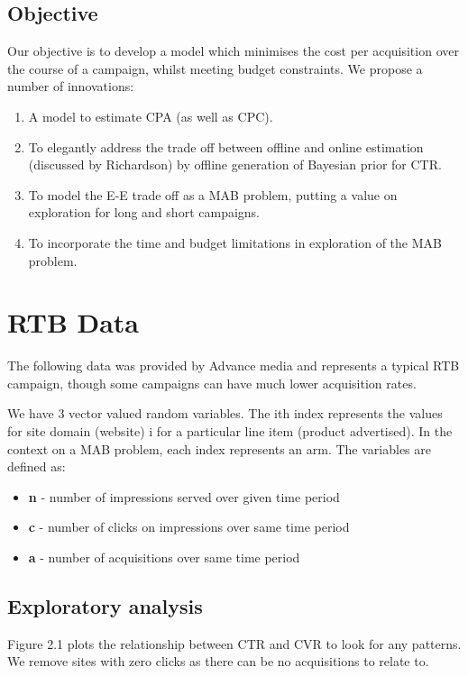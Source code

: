 \documentclass[11pt,a4,singlespacing,titlepagenumber=on]{scrreprt}
\numberwithin{equation}{chapter} %
\theoremstyle{remark}
\begin{document}
\section{Objective}
Our objective is to develop a model which minimises the cost per acquisition over the course of a campaign, whilst meeting budget constraints. We propose a number of innovations:
\begin{enumerate}
	\item A model to estimate CPA (as well as CPC).
	\item To elegantly address the trade off between offline and online estimation (discussed by Richardson) by offline generation of Bayesian prior for CTR.
	\item To model the E-E trade off as a MAB problem, putting a value on exploration for long and short campaigns.
	\item To incorporate the time and budget limitations in exploration of the MAB problem.
\end{enumerate}


\chapter{RTB Data}

The following data was provided by Advance media and represents a typical RTB campaign, though some campaigns can have much lower acquisition rates.

We have 3 vector valued random variables. The ith index represents the values for site domain (website) i for a particular line item (product advertised). In the context on a MAB problem, each index represents an arm. The variables are defined as:
\begin{itemize}
	\item \textbf{n} - number of impressions served over given time period
	\item \textbf{c} - number of clicks on impressions over same time period 
	\item \textbf{a} - number of acquisitions over same time period
\end{itemize}

\section{Exploratory analysis}

Figure 2.1 plots the relationship between CTR and CVR to look for any patterns. We remove sites with zero clicks as there can be no acquisitions to relate to. 
\end{document}

